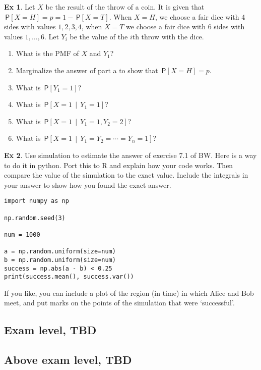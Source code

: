 \documentclass[a4paper]{article}
\theoremstyle{definition}
\newtheorem{exercise}{Ex}[section]
\newcommand{\given}{\,\middle|\,}
\renewcommand{\P}[1]{\,\mathsf{P}\left[#1\right]}
\newcommand{\1}[1]{\,I_{#1}} %
\begin{document}
\begin{exercise}
Let $X$ be the result of the throw of a coin.
It is given that $\P{X=H} = p = 1-\P{X=T}$.
When $X=H$, we choose a fair dice with 4 sides with values $1,2,3,4$, when $X=T$ we choose a fair dice with 6 sides with values $1,\ldots,6$.
Let $Y_i$ be the value of the $i$th throw with the dice.
\begin{enumerate}
\item What is the PMF of $X$ and $Y_1$?
\item Marginalize  the answer of part a to show that $\P{X=H} = p$. 
\item What is $\P{Y_{1}=1}$?
\item What is $\P{X=1 \given Y_1=1}$?
\item What is $\P{X=1 \given Y_1=1, Y_2=2}$?
\item What is $\P{X=1 \given Y_1=Y_2=\cdots=Y_n = 1}$?
\end{enumerate}

\end{exercise}

\begin{exercise} 
Use simulation to estimate the answer of exercise 7.1 of BW.
Here is a way to do it in python.
Port this to R and explain how your code works.
Then compare the value of the simulation to the exact value.
Include the integrals in your answer to show how you found the exact answer.


\begin{verbatim}
import numpy as np

np.random.seed(3)

num = 1000

a = np.random.uniform(size=num)
b = np.random.uniform(size=num)
success = np.abs(a - b) < 0.25
print(success.mean(), success.var())
\end{verbatim}



If you like, you can include a plot of the region (in time) in which Alice and Bob meet, and put marks on the points of the simulation that were `successful'. 




\end{exercise}


\subsection{Exam level, TBD}
\label{sec:exam-level}


\subsection{Above exam level, TBD}
\label{sec:above-exam-level}
\end{document}
